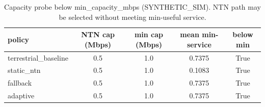 \begin{table}[h]\centering
\caption{Capacity probe below min\_capacity\_mbps (SYNTHETIC\_SIM). NTN path may be selected without meeting min-useful service.}
\begin{tabular}{lcccc}\toprule
policy & NTN cap (Mbps) & min cap (Mbps) & mean min-service & below min \\\midrule
terrestrial\_baseline & 0.5 & 1.0 & 0.7375 & True \\
static\_ntn & 0.5 & 1.0 & 0.1083 & True \\
fallback & 0.5 & 1.0 & 0.7375 & True \\
adaptive & 0.5 & 1.0 & 0.7375 & True \\
\bottomrule\end{tabular}\end{table}
